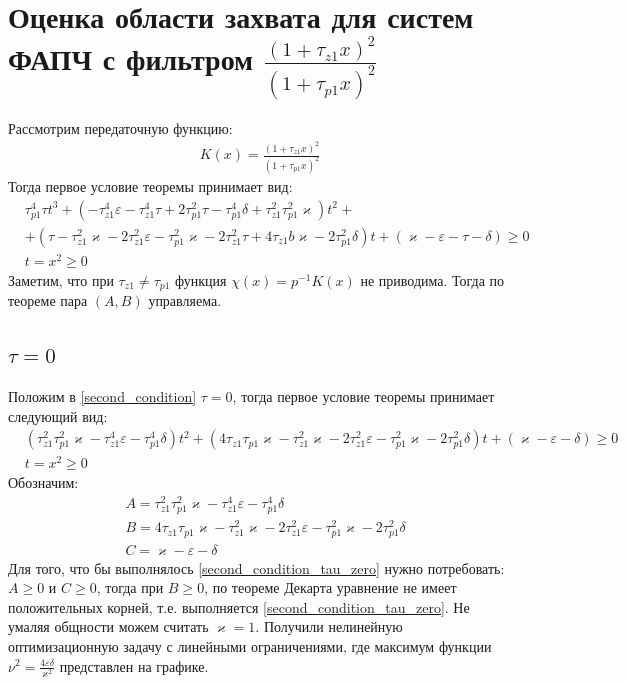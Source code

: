 \documentclass[a4paper]{article}
\begin{document}
\section{Оценка области захвата для систем ФАПЧ с фильтром $\frac{(1+\tau_{z1}x)^2}{(1+\tau_{p1}x)^2}$}
 Рассмотрим передаточную функцию:
 \begin{equation}\label{filter2}
 \begin{aligned}
K(x) = \frac{(1+\tau_{z1}x)^2}{(1+\tau_{p1}x)^2}
 \end{aligned}
\end{equation}
Тогда первое условие теоремы принимает вид:
 \begin{equation}\label{second_condition}
 \begin{aligned}
&\tau_{p1}^4\tau t^3 +(- \tau_{z1}^4\varepsilon - \tau_{z1}^4\tau + 2\tau_{p1}^2\tau- \tau_{p1}^4\delta + \tau_{z1}^2\tau_{p1}^2\varkappa)t^2  +\\
&+( \tau- \tau_{z1}^2\varkappa - 2\tau_{z1}^2\varepsilon - \tau_{p1}^2\varkappa- 2\tau_{z1}^2\tau+ 4\tau_{z1}b\varkappa- 2\tau_{p1}^2\delta)t + (\varkappa-\varepsilon - \tau - \delta)  \geq 0\\
&t = x^2 \geq 0
 \end{aligned}
\end{equation}
Заметим, что при $\tau_{z1} \neq \tau_{p1}$ функция $\chi (x) = p^{-1}K(x)$ не приводима. Тогда по теореме пара $(A, B)$ управляема.
\subsection{$\tau = 0$}
Положим в \eqref{second_condition} $\tau = 0$, тогда первое условие теоремы принимает следующий вид:
 \begin{equation}\label{second_condition_tau_zero}
 \begin{aligned}
&(\tau_{z1}^2\tau_{p1}^2\varkappa - \tau_{z1}^4\varepsilon - \tau_{p1}^4\delta)t^2 +( 4\tau_{z1}\tau_{p1}\varkappa - \tau_{z1}^2\varkappa - 2\tau_{z1}^2\varepsilon - \tau_{p1}^2\varkappa - 2\tau_{p1}^2\delta)t + (\varkappa-\varepsilon - \delta)  \geq 0\\
&t = x^2 \geq 0
 \end{aligned}
\end{equation}
Обозначим:
 \begin{equation}
 \begin{aligned}
&A = \tau_{z1}^2\tau_{p1}^2\varkappa - \tau_{z1}^4\varepsilon - \tau_{p1}^4\delta\\
&B = 4\tau_{z1}\tau_{p1}\varkappa - \tau_{z1}^2\varkappa - 2\tau_{z1}^2\varepsilon - \tau_{p1}^2\varkappa - 2\tau_{p1}^2\delta\\
&C = \varkappa-\varepsilon - \delta
 \end{aligned}
\end{equation}
Для того, что бы выполнялось \eqref{second_condition_tau_zero} нужно потребовать: $A \geq 0$ и $C \geq 0$, тогда  при $B \geq 0$, по теореме Декарта уравнение не имеет положительных корней, т.е. выполняется \eqref{second_condition_tau_zero}. Не умаляя общности можем считать $\varkappa = 1$. Получили нелинейную оптимизационную задачу с линейными ограничениями, где максимум функции $\nu^2 = \frac{4\varepsilon\delta}{\varkappa^2}$ представлен на графике.
\end{document}
